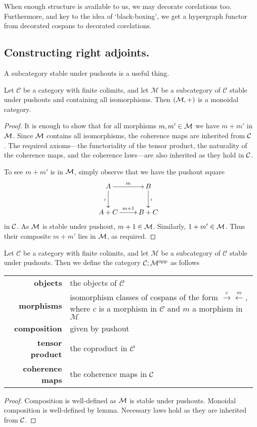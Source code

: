 When enough structure is available to us, we may decorate corelations too.
Furthermore, and key to the idea of `black-boxing', we get a hypergraph functor
from decorated cospans to decorated corelations.


\subsection{Constructing right adjoints.}
A subcategory stable under pushouts is a useful thing.

\begin{lemma}
  Let $\mathcal C$ be a category with finite colimits, and let $\mathcal M$ be a
  subcategory of $\mathcal C$ stable under pushouts and containing all
  isomorphisms. Then $(\mathcal M,+)$ is a monoidal category.
\end{lemma}
\begin{proof}
  It is enough to show that for all morphisms $m,m' \in \mathcal M$ we have $m+m'$ in
  $\mathcal M$. Since $\mathcal M$ contains all isomorphisms, the coherence maps are
  inherited from $\mathcal C$. The required axioms---the functoriality of the tensor
  product, the naturality of the coherence maps, and the coherence laws---are
  also inherited as they hold in $\mathcal C$.

  To see $m+m'$ is in $\mathcal M$, simply observe that we have the pushout square
  \[
    \xymatrix{
      A \ar[r]^m \ar[d]_{\iota} & B \ar[d]^{\iota} \\
      A+C \ar[r]^{m+1} & B+C
    }
  \]
  in $\mathcal C$. As $\mathcal M$ is stable under pushout, $m+1 \in \mathcal M$. Similarly,
  $1+m' \in \mathcal M$. Thus their composite $m+m'$ lies in $\mathcal M$, as required.
\end{proof}

\begin{proposition}
  Let $\mathcal C$ be a category with finite colimits, and let $\mathcal M$ be a
  subcategory of $\mathcal C$ stable under pushouts. Then we define the category
  $\mathcal C; \mathcal M^{\mathrm{opp}}$ as follows  
  
  \begin{tabular}{ r p{}}
    \textbf{objects} & the objects of $\mathcal C$ \\ 
    \textbf{morphisms} & isomorphism classes of cospans of the form $\stackrel{c}\rightarrow
  \stackrel{m}\leftarrow$, where $c$ is a morphism in $\mathcal C$ and $m$ a
  morphism in $\mathcal M$\\ 
  \textbf{composition} & given by pushout \\
  \textbf{tensor product} & the coproduct in $\mathcal C$ \\
  \textbf{coherence maps} & the coherence maps in $\mathcal C$
  \end{tabular}
\end{proposition}
\begin{proof}
  Composition is well-defined as $\mathcal M$ is stable under pushouts. Monoidal
  composition is well-defined by lemma. Necessary laws hold as they are
  inherited from $\mathcal C$. 
\end{proof}

